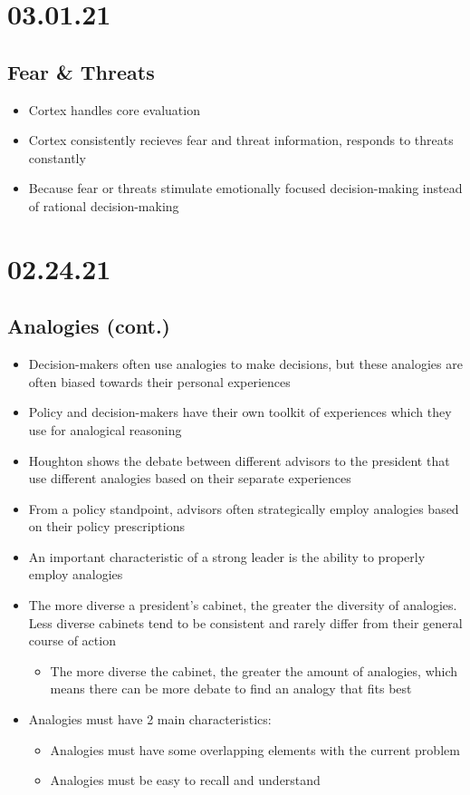 \documentclass[11pt]{article}
\begin{document}
\section*{03.01.21}
\label{sec:org98e961c}
\subsection*{Fear \& Threats}
\label{sec:orgd2299e2}
\begin{itemize}
\item Cortex handles core evaluation
\item Cortex consistently recieves fear and threat information, responds to threats constantly
\item Because fear or threats stimulate emotionally focused decision-making instead of rational decision-making
\end{itemize}
\section*{02.24.21}
\label{sec:orgbe6cbfe}
\subsection*{Analogies (cont.)}
\label{sec:org6f01a07}
\begin{itemize}
\item Decision-makers often use analogies to make decisions, but these analogies are often biased towards their personal experiences
\item Policy and decision-makers have their own toolkit of experiences which they use for analogical reasoning
\item Houghton shows the debate between different advisors to the president that use different analogies based on their separate experiences
\item From a policy standpoint, advisors often strategically employ analogies based on their policy prescriptions
\item An important characteristic of a strong leader is the ability to properly employ analogies
\item The more diverse a president's cabinet, the greater the diversity of analogies. Less diverse cabinets tend to be consistent and rarely differ from their general course of action
\begin{itemize}
\item The more diverse the cabinet, the greater the amount of analogies, which means there can be more debate to find an analogy that fits best
\end{itemize}
\item Analogies must have 2 main characteristics:
\begin{itemize}
\item Analogies must have some overlapping elements with the current problem
\item Analogies must be easy to recall and understand
\end{itemize}
\end{itemize}
\end{document}
